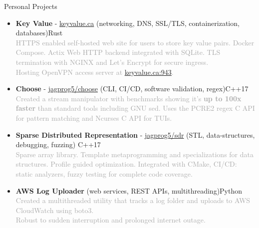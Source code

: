 \documentclass{resume} %
\begin{document}
\begin{rSection}{Personal Projects}
    \begin{itemize}
        \setlength\itemsep{-0.2em}
        \item {\bf Key Value} - \href{http://www.keyvalue.ca/}{keyvalue.ca} (networking, DNS, SSL/TLS, containerization, databases)\hfill Rust\\
        \textcolor{darkgray}{HTTPS enabled self-hosted web site for users to store key value pairs. Docker Compose. Actix Web HTTP backend integrated with SQLite. TLS termination with NGINX and Let's Encrypt for secure ingress.\\
        Hosting OpenVPN access server at \href{keyvalue.ca:943}{keyvalue.ca:943}.}
        \item {\bf Choose} - \href{https://github.com/jagprog5/choose/}{jagprog5/choose} (CLI, CI/CD, software validation, regex)\hfill C++17\\
        \textcolor{darkgray}{Created a stream manipulator with benchmarks showing it's \textbf{up to 100x faster} than standard tools including GNU sed.
        Uses the PCRE2 regex C API for pattern matching and Ncurses C API for TUIs.}
        \item {\bf Sparse Distributed Representation} - \href{https://github.com/jagprog5/SDR/}{jagprog5/sdr} (STL, data-structures, debugging, fuzzing) \hfill C++17\\
        \textcolor{darkgray}{Sparse array library. Template metaprogramming and specializations for data structures. Profile guided optimization. Integrated with CMake, CI/CD: static analyzers, fuzzy testing for complete code coverage.}
        \item {\bf AWS Log Uploader} (web services, REST APIs, multithreading)\hfill Python\\
        \textcolor{darkgray}{Created a multithreaded utility that tracks a log folder and uploads to AWS CloudWatch using boto3.\\
        Robust to sudden interruption and prolonged internet outage.}
    \end{itemize}
\end{rSection}
\end{document}
